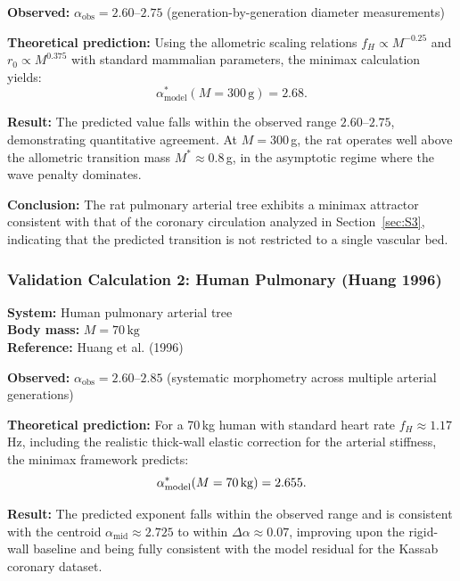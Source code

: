 \documentclass[11pt,a4paper]{article}
\theoremstyle{remark}
\begin{document}
\textbf{Observed:} $\alpha_{\mathrm{obs}} = 2.60$--$2.75$
(generation-by-generation diameter measurements)

\textbf{Theoretical prediction:} Using the allometric scaling relations $f_H
\propto M^{-0.25}$ and $r_0 \propto M^{0.375}$ with standard mammalian
parameters, the minimax calculation yields:
\begin{equation}
\alpha^*_{\mathrm{model}}(M=300\,\mathrm{g}) = 2.68.
\end{equation}

\textbf{Result:} The predicted value falls within the observed range
$2.60$--$2.75$, demonstrating quantitative agreement. At $M=300\,$g, the rat
operates well above the allometric transition mass $M^* \approx 0.8\,$g, in the
asymptotic regime where the wave penalty dominates.

\textbf{Conclusion:} The rat pulmonary arterial tree exhibits a minimax
attractor consistent with that of the coronary circulation analyzed in
Section~\ref{sec:S3}, indicating that the predicted transition is not restricted
to a single vascular bed.

\subsubsection{Validation Calculation 2: Human Pulmonary (Huang 1996)}
\label{sec:S_val_human}

\textbf{System:} Human pulmonary arterial tree\\
\textbf{Body mass:} $M = 70\,\mathrm{kg}$\\
\textbf{Reference:} Huang et al. (1996)~\cite{huang1996}

\textbf{Observed:} $\alpha_{\mathrm{obs}} = 2.60$--$2.85$ (systematic
morphometry across multiple arterial generations)

\textbf{Theoretical prediction:} For a 70\,kg human with standard heart rate
$f_H \approx 1.17\,$Hz, including the realistic thick-wall elastic correction
for the arterial stiffness, the minimax framework predicts:
\begin{equation}
\alpha^*_{\mathrm{model}}(M=70\,\mathrm{kg}) = 2.655.
\end{equation}

\textbf{Result:} The predicted exponent falls within the observed range and is
consistent with the centroid $\alpha_{\mathrm{mid}} \approx 2.725$ to within
$\Delta\alpha \approx 0.07$, improving upon the rigid-wall baseline and
being fully consistent with the model residual for the Kassab coronary dataset.
\end{document}
